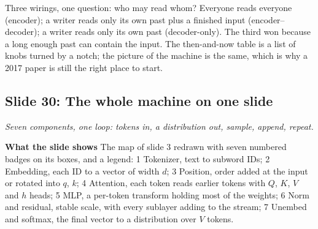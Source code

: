 \documentclass[11pt,letterpaper]{article}
\newcommand{\slide}[3]{%
  \subsection[Slide #1: #2]{Slide #1: #2}%
  {\color{muted}\itshape #3\par}\medskip}
\newcommand{\para}[1]{\medskip\noindent\textbf{#1}\quad}
\newenvironment{intuition}{\begin{tcolorbox}[intuitionbox]}{\end{tcolorbox}}
\begin{document}
\begin{intuition}
Three wirings, one question: who may read whom? Everyone reads everyone (encoder); a writer reads only its own past plus a finished input (encoder--decoder); a writer reads only its own past (decoder-only). The third won because a long enough past can contain the input. The then-and-now table is a list of knobs turned by a notch; the picture of the machine is the same, which is why a 2017 paper is still the right place to start.
\end{intuition}

\slide{30}{The whole machine on one slide}{Seven components, one loop: tokens in, a distribution out, sample, append, repeat.}

\para{What the slide shows} The map of slide 3 redrawn with seven numbered badges on its boxes, and a legend: 1 Tokenizer, text to subword IDs; 2 Embedding, each ID to a vector of width $d$; 3 Position, order added at the input or rotated into $q$, $k$; 4 Attention, each token reads earlier tokens with $Q$, $K$, $V$ and $h$ heads; 5 MLP, a per-token transform holding most of the weights; 6 Norm and residual, stable scale, with every sublayer adding to the stream; 7 Unembed and softmax, the final vector to a distribution over $V$ tokens.
\end{document}
